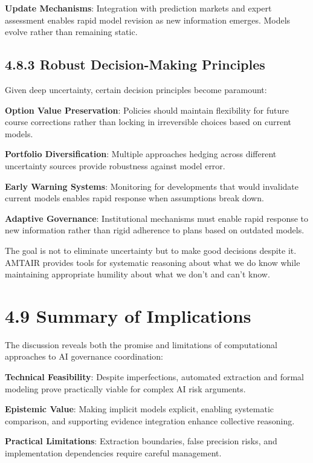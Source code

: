 \documentclass[
  11pt,
  letterpaper,
  openany]{book}
\begin{document}
\textbf{Update Mechanisms}: Integration with prediction markets and
expert assessment enables rapid model revision as new information
emerges. Models evolve rather than remaining static.

\subsection{4.8.3 Robust Decision-Making
Principles}\label{sec-robust-principles}

Given deep uncertainty, certain decision principles become paramount:

\textbf{Option Value Preservation}: Policies should maintain flexibility
for future course corrections rather than locking in irreversible
choices based on current models.

\textbf{Portfolio Diversification}: Multiple approaches hedging across
different uncertainty sources provide robustness against model error.

\textbf{Early Warning Systems}: Monitoring for developments that would
invalidate current models enables rapid response when assumptions break
down.

\textbf{Adaptive Governance}: Institutional mechanisms must enable rapid
response to new information rather than rigid adherence to plans based
on outdated models.

The goal is not to eliminate uncertainty but to make good decisions
despite it. AMTAIR provides tools for systematic reasoning about what we
do know while maintaining appropriate humility about what we don't and
can't know.

\section{4.9 Summary of Implications}\label{sec-implications-summary}

The discussion reveals both the promise and limitations of computational
approaches to AI governance coordination:

\textbf{Technical Feasibility}: Despite imperfections, automated
extraction and formal modeling prove practically viable for complex AI
risk arguments.

\textbf{Epistemic Value}: Making implicit models explicit, enabling
systematic comparison, and supporting evidence integration enhance
collective reasoning.

\textbf{Practical Limitations}: Extraction boundaries, false precision
risks, and implementation dependencies require careful management.
\end{document}
